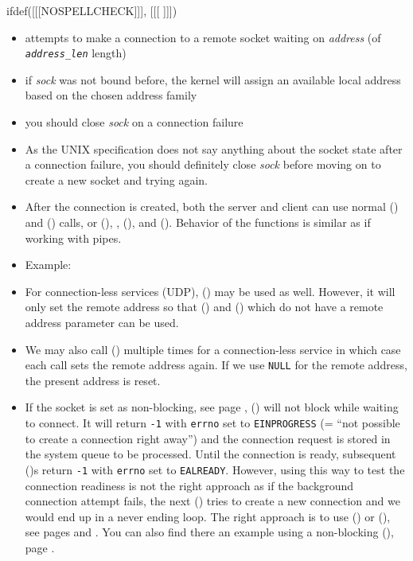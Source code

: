 
\begin{slide}
ifdef([[[NOSPELLCHECK]]], [[[
]]])
\begin{itemize}
\item attempts to make a connection to a remote socket waiting on \emph{address}
(of \emph{\texttt{address\_len}} length) 
\item if \emph{sock} was not bound before, the kernel will assign an available
local address based on the chosen address family
\item you should close \emph{sock} on a connection failure
\end{itemize}
\end{slide}


\begin{itemize}
\item As the UNIX specification does not say anything about the socket state
after a connection failure, you should definitely close \emph{sock} before
moving on to create a new socket and trying again.
\item After the connection is created, both the server and client can use normal
() and () calls, or (), ,
(), and ().  Behavior of the functions is similar
as if working with pipes.
\item Example:  
\item {} For connection-less services (UDP),
() may be used as well.  However, it will only set the remote
address so that () and () which do not have a remote
address parameter can be used.
\item We may also call () multiple times for a connection-less
service in which case each call sets the remote address again.  If we use
\texttt{NULL} for the remote address, the present address is reset.
\item If the socket is set as non-blocking, see page \pageref{FCNTL},
() will not block while waiting to connect.  It will return
\texttt{-1} with \texttt{errno} set to \texttt{EINPROGRESS} (= ``not possible to
create a connection right away'') and the connection request is stored in the
system queue to be processed.  Until the connection is ready, subsequent
()s return \texttt{-1} with \texttt{errno} set to
\texttt{EALREADY}.  However, using this way to test the connection readiness is
not the right approach as if the background connection attempt fails, the next
() tries to create a new connection and we would end up in a
never ending loop.  The right approach is to use () or
(), see pages \pageref{SELECT} and \pageref{POLL}.  You can also
find there an example using a non-blocking (), page
\pageref{NON_BLOCKING_CONNECT}.
\end{itemize}

